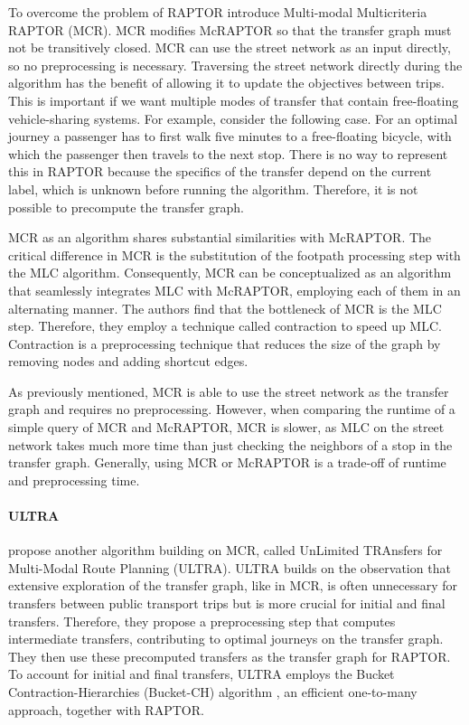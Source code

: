 To overcome the problem of RAPTOR  introduce Multi-modal Multicriteria RAPTOR (MCR).
MCR modifies McRAPTOR so that the transfer graph must not be transitively closed.
MCR can use the street network as an input directly, so no preprocessing is necessary.
Traversing the street network directly during the algorithm has the benefit of allowing it to update the objectives between trips.
This is important if we want multiple modes of transfer that contain free-floating vehicle-sharing systems.
For example, consider the following case.
For an optimal journey a passenger has to first walk five minutes to a free-floating bicycle, with which the passenger then travels to the next stop.
There is no way to represent this in RAPTOR because the specifics of the transfer depend on the current label, which is unknown before running the algorithm.
Therefore, it is not possible to precompute the transfer graph.

MCR as an algorithm shares substantial similarities with McRAPTOR.
The critical difference in MCR is the substitution of the footpath processing step with the MLC algorithm.
Consequently, MCR can be conceptualized as an algorithm that seamlessly integrates MLC with McRAPTOR, employing each of them in an alternating manner.
The authors find that the bottleneck of MCR is the MLC step.
Therefore, they employ a technique called contraction  to speed up MLC.
Contraction is a preprocessing technique that reduces the size of the graph by removing nodes and adding shortcut edges.

As previously mentioned, MCR is able to use the street network as the transfer graph and requires no preprocessing.
However, when comparing the runtime of a simple query of MCR and McRAPTOR, MCR is slower, as MLC on the street network takes much more time than just checking the neighbors of a stop in the transfer graph.
Generally, using MCR or McRAPTOR is a trade-off of runtime and preprocessing time.


\paragraph{ULTRA}
\label{subsubsec:ultra}

 propose another algorithm building on MCR, called UnLimited TRAnsfers for Multi-Modal Route Planning (ULTRA).
ULTRA builds on the observation that extensive exploration of the transfer graph, like in MCR, is often unnecessary for transfers between public transport trips but is more crucial for initial and final transfers.
Therefore, they propose a preprocessing step that computes intermediate transfers, contributing to optimal journeys on the transfer graph.
They then use these precomputed transfers as the transfer graph for RAPTOR.
To account for initial and final transfers, ULTRA employs the Bucket Contraction-Hierarchies (Bucket-CH) algorithm , an efficient one-to-many approach, together with RAPTOR.

